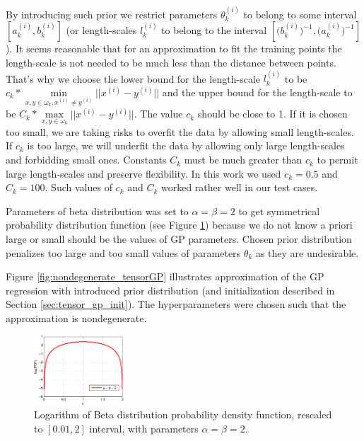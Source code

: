 By introducing such prior we restrict parameters $\theta_k^{(i)}$ to belong
to some interval $\left [a_k^{(i)}, b_k^{(i)} \right ]$ (or length-scales $l_k^{(i)}$ to belong to the interval
$\left [\big (b_k^{(i)} \big)^{-1}, \big (a_k^{(i)} \big )^{-1} \right ]$).
It seems reasonable that for an approximation to fit the training points
the length-scale is not needed to be much less than the distance between points.
That's why we choose the lower bound for the length-scale $l_k^{(i)}$ to be $c_k * \min\limits_{x, y \in \omega_k, x^{(i)} \ne y^{(i)}} ||x^{(i)} - y^{(i)}||$
and the upper bound for the length-scale to be ${C_k * \max\limits_{x, y \in \omega_k} ||x^{(i)} - y^{(i)}||}$.
The value $c_k$ should be close to 1.
If it is chosen too small, we are taking risks to overfit the data by allowing small length-scales.
If $c_k$ is too large, we will underfit the data by allowing only large length-scales and forbidding small ones.
Constants $C_k$ must be much greater than $c_k$ to permit large length-scales and preserve flexibility.
In this work we used $c_k = 0.5$ and $C_k = 100$.
Such values of $c_k$ and $C_k$ worked rather well in our test cases.

Parameters of beta distribution was set to $\alpha = \beta = 2$ to get
symmetrical probability distribution function (see Figure \ref{fig:beta}) because
we do not know a priori large or small should be the values of GP parameters.
Chosen prior distribution penalizes too large and too small values of parameters $\theta_k$
as they are undesirable.

Figure \ref{fig:nondegenerate_tensorGP} illustrates approximation
of the GP regression with introduced prior distribution (and initialization described in Section \ref{sec:tensor_gp_init}).
The hyperparameters were chosen such that the approximation
is nondegenerate.

\begin{figure}
  \centering
  \includegraphics[width=0.3\textwidth]{figures/gp_on_grid/beta.pdf}
  \caption{Logarithm of Beta distribution probability density function, rescaled to $[0.01, 2]$ interval,
    with parameters $\alpha = \beta = 2$.}
  \label{fig:beta}
\end{figure}



